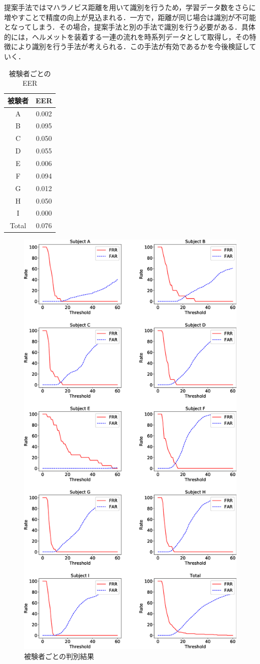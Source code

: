 \documentclass[Japanese,noauthor]{dicomopapers}
\begin{document}
提案手法ではマハラノビス距離を用いて識別を行うため，学習データ数をさらに増やすことで精度の向上が見込まれる．一方で，距離が同じ場合は識別が不可能となってしまう．その場合，提案手法と別の手法で識別を行う必要がある．具体的には，ヘルメットを装着する一連の流れを時系列データとして取得し，その特徴により識別を行う手法が考えられる．この手法が有効であるかを今後検証していく．

\begin{table}[!t]
  \centering
  \caption{被験者ごとのEER}
  \begin{tabular}{c|c} \hline\hline
    被験者 & EER \\ \hline
    A & 0.002 \\
    B & 0.095 \\
    C & 0.050 \\
    D & 0.055 \\
    E & 0.006 \\
    F & 0.094 \\
    G & 0.012 \\
    H & 0.050 \\
    I & 0.000 \\ \hline
    Total & 0.076 \\ \hline
  \end{tabular}
  \label{EER_num}
\end{table}

\begin{figure}[!t]
  \centering
    \includegraphics[width=0.70\linewidth]{figure/EER.eps}
  \caption{被験者ごとの判別結果}
  \label{EER}
\end{figure}
\end{document}
